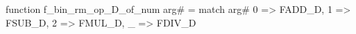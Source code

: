 function f_bin_rm_op_D_of_num arg# = match arg# {
  0 => FADD_D,
  1 => FSUB_D,
  2 => FMUL_D,
  _ => FDIV_D
}

